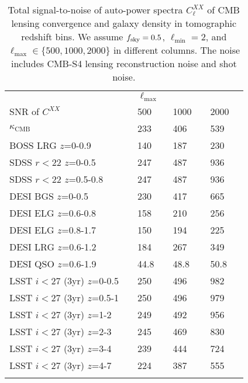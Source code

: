 \documentclass[prd,superscriptaddress,floatfix,notitlepage,nofootinbib,reprint]{revtex4-1} %
\begin{document}
\begin{table}[tbp]
\centering
\renewcommand{\arraystretch}{1.0}
\begin{tabular}{@{}p{4.0cm}lllllll@{}}
\toprule
 & \phantom{} & \multicolumn{5}{l}{$\ell_\mathrm{max}$}  \\ 
SNR of $C^{XX}$ &&  500  &\phantom{$\,$}&  1000  &\phantom{$\,$}&  2000 \\ 
\colrule 
$\kappa_\mathrm{CMB}$  && 233 && 406 && 539 \\
BOSS LRG $z$=0-0.9  && 140 && 187 && 230 \\
SDSS $r<22$ $z$=0-0.5  && 247 && 487 && 936 \\
SDSS $r<22$ $z$=0.5-0.8  && 247 && 487 && 936 \\
DESI BGS $z$=0-0.5  && 230 && 417 && 665 \\
DESI ELG $z$=0.6-0.8  && 158 && 210 && 256 \\
DESI ELG $z$=0.8-1.7  && 150 && 194 && 225 \\
DESI LRG $z$=0.6-1.2  && 184 && 267 && 349 \\
DESI QSO $z$=0.6-1.9  && 44.8 && 48.8 && 50.8 \\
LSST $i<27$ (3yr) $z$=0-0.5  && 250 && 496 && 982 \\
LSST $i<27$ (3yr) $z$=0.5-1  && 250 && 496 && 979 \\
LSST $i<27$ (3yr) $z$=1-2  && 249 && 492 && 956 \\
LSST $i<27$ (3yr) $z$=2-3  && 245 && 469 && 830 \\
LSST $i<27$ (3yr) $z$=3-4  && 239 && 444 && 724 \\
LSST $i<27$ (3yr) $z$=4-7  && 224 && 387 && 555 \\
\botrule
\end{tabular}
\caption{Total signal-to-noise 
 of auto-power spectra $C^{XX}_\ell$ of CMB lensing convergence and galaxy density in tomographic redshift bins.
We assume ${f_\mathrm{sky}}=0.5$, $\ell_\mathrm{min}=2$, and $\ell_\mathrm{max}\in\{500,1000,2000\}$ in different columns.
The noise includes CMB-S4 lensing reconstruction noise and shot noise.
}
\label{tab:AutoSNR}
\end{table}
\end{document}
